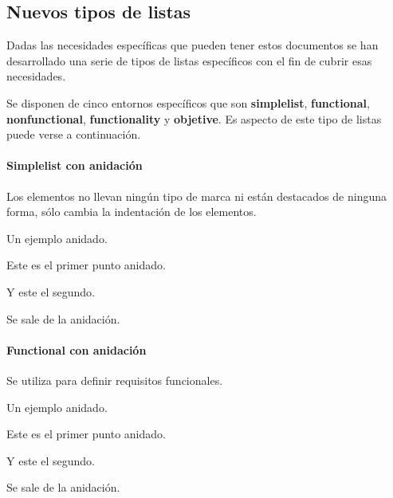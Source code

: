 \subsection{Nuevos tipos de listas}

Dadas las necesidades específicas que pueden tener estos documentos se han desarrollado una serie de tipos de listas específicos con el fin de cubrir esas necesidades.

Se disponen de cinco entornos específicos que son \textbf{simplelist}, \textbf{functional}, \textbf{nonfunctional}, \textbf{functionality} y \textbf{objetive}. Es aspecto de este tipo de listas puede verse a continuación.

\paragraph{Simplelist con anidación}

Los elementos no llevan ningún tipo de marca ni están destacados de ninguna forma, sólo cambia la indentación de los elementos.

\begin{simplelist}
        \item Un ejemplo anidado.
        \begin{simplelist}
                \item Este es el primer punto anidado.
                \item Y este el segundo.
        \end{simplelist}
        \item Se sale de la anidación.
\end{simplelist}

\paragraph{Functional con anidación}

Se utiliza para definir requisitos funcionales.

\begin{functional}
        \item Un ejemplo anidado.
        \begin{functional}
                \item Este es el primer punto anidado.
                \item Y este el segundo.
        \end{functional}
        \item Se sale de la anidación.
\end{functional}

